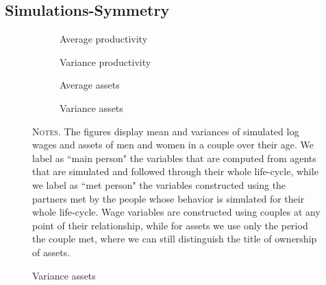 \documentclass[12pt]{article}
\numberwithin{table}{section}
\begin{document}
\subsection{Simulations-Symmetry}
\begin{figure}[ht]
\begin{center}
\caption{\\ Log Income and assets mean and variances by age---simulated data}
\label{fig:symmetry}

\begin{subfigure}{.49\textwidth}
\centering
\caption{Average productivity}
\label{fig:sub-firs1t}
\scalebox{0.5}{ } 
\end{subfigure}
\begin{subfigure}{.49\textwidth}
\centering
\caption{Variance productivity}
\label{fig:sub-second1}
\scalebox{0.5}{ } 
\end{subfigure}
\end{center}

\hspace{20em}

\begin{center}
\begin{subfigure}{.49\textwidth}
\centering
\caption{Average assets}
\label{fig:sub-third12}
\scalebox{0.5}{ } 
\end{subfigure}
\begin{subfigure}{.49\textwidth}
\centering
\caption{Variance assets}
\label{fig:sub-third13}
\scalebox{0.5}{ } 
\end{subfigure}
\end{center}

\begin{minipage}{0.99\textwidth} %
{\footnotesize \textsc{Notes.} The figures display mean and variances of simulated log wages and assets of men and women in a couple over their age. We label as ``main person" the variables that are computed from agents that are simulated and followed through their whole life-cycle, while we label as ``met person" the variables constructed using the partners met by the people whose behavior is simulated for their whole life-cycle. Wage variables are constructed using couples at any point of their relationship, while for assets we use only the period the couple met, where we can still distinguish the title of ownership of assets. \par}
\end{minipage}
\end{figure}
\FloatBarrier
\end{document}
